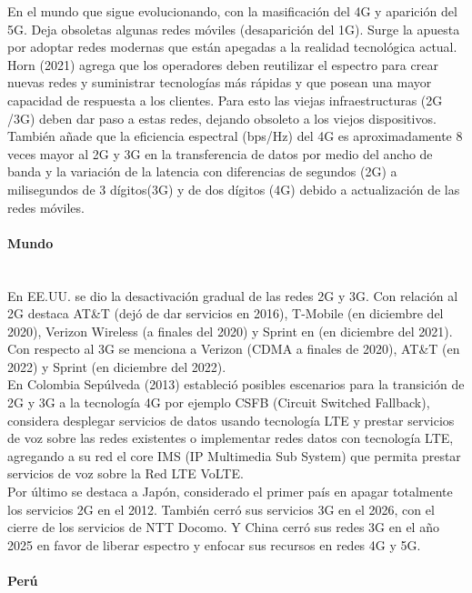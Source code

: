 \documentclass[12pt,a4paper]{article}
\begin{document}
	En el mundo que sigue evolucionando, con la masificación del 4G y aparición del 5G. Deja obsoletas algunas redes móviles (desaparición del 1G). Surge la apuesta por adoptar redes modernas que están apegadas a la realidad tecnológica actual.\\
	
	Horn (2021) agrega que los operadores deben reutilizar el espectro para crear nuevas redes y suministrar tecnologías más rápidas y que posean una mayor capacidad de respuesta a los clientes. Para esto las viejas infraestructuras (2G /3G) deben dar paso a estas redes, dejando obsoleto a los viejos dispositivos. También añade que la eficiencia espectral (bps/Hz) del 4G es aproximadamente 8 veces mayor al 2G y 3G en la transferencia de datos por medio del ancho de banda y la variación de la latencia con diferencias de segundos (2G) a milisegundos de 3 dígitos(3G) y de dos dígitos (4G) debido a actualización de las redes móviles.
	
	\paragraph*{Mundo} \mbox{}\\
	
	En EE.UU. se dio la desactivación  gradual de las redes 2G y 3G. Con relación al 2G destaca AT\&T (dejó de dar servicios en 2016), T-Mobile (en diciembre del 2020), Verizon Wireless (a finales del 2020) y Sprint en (en diciembre del 2021). Con respecto al 3G se menciona a Verizon (CDMA a finales de 2020),  AT\&T (en 2022) y Sprint (en diciembre del 2022).\\
	
	En Colombia Sepúlveda (2013) estableció posibles escenarios para la transición de 2G y 3G a la tecnología 4G por ejemplo CSFB (Circuit Switched Fallback), considera desplegar servicios de datos usando tecnología LTE y prestar servicios de voz sobre las redes existentes o implementar redes datos con tecnología LTE, agregando a su red el core IMS (IP Multimedia Sub System) que permita prestar servicios de voz sobre la Red LTE VoLTE.\\
	
	Por último se destaca a Japón, considerado el primer país en apagar totalmente los servicios 2G en el 2012. También cerró sus servicios 3G en el 2026, con el cierre de los servicios de NTT Docomo. Y China cerró sus redes 3G en el año 2025 en favor de liberar espectro y enfocar sus recursos en redes 4G y 5G.
	
	\paragraph*{Perú} \mbox{}\\
	
\end{document}
